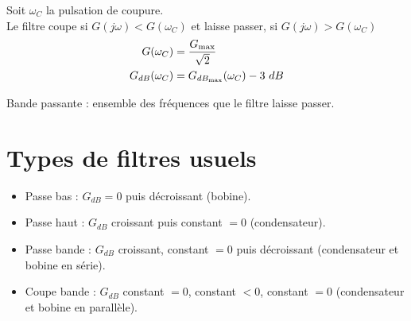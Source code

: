 \documentclass[13pt, twoside, a4paper, french]{report}
\begin{document}
    Soit $\omega_C$ la pulsation de coupure.\\
    Le filtre coupe si $G(j\omega) < G(\omega_C)$ et laisse passer, si $G(j\omega) > G(\omega_C)$
    \begin{align*}
        G(\omega_C) &= \dfrac{G_{\max}}{\sqrt{2}}\\
        G_{dB}(\omega_C) &= G_{dB_\textrm{max}}(\omega_C) - 3\ dB
    \end{align*}

    Bande passante : ensemble des fréquences que le filtre laisse passer.

    \section{Types de filtres usuels}\label{sec:types-de-filtres-usuels}

    \begin{itemize}
        \item Passe bas : $G_{dB} = 0$ puis décroissant (bobine).
        \item Passe haut : $G_{dB}$ croissant puis constant $= 0$ (condensateur).
        \item Passe bande : $G_{dB}$ croissant, constant $= 0$ puis décroissant (condensateur et bobine en série).
        \item Coupe bande : $G_{dB}$ constant $= 0$, constant $< 0$, constant $= 0$ (condensateur et bobine en parallèle).
    \end{itemize}
\end{document}
